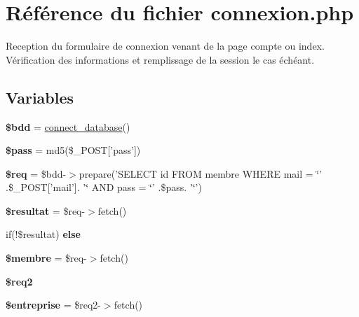 \hypertarget{connexion_8php}{\section{Référence du fichier connexion.\-php}
\label{connexion_8php}
}


Reception du formulaire de connexion venant de la page compte ou index. Vérification des informations et remplissage de la session le cas échéant.  


\subsection*{Variables}
\begin{DoxyCompactItemize}
\item 
\hypertarget{connexion_8php_a94f91e878bce0991e2cd595c5dd79b3f}{{\bfseries \$bdd} = \hyperlink{function_8php_a1f56f7efe8c1222675d8715c259957d5}{connect\-\_\-database}()}\label{connexion_8php_a94f91e878bce0991e2cd595c5dd79b3f}

\item 
\hypertarget{connexion_8php_a12ec2780b52bd1c54d38c2f981c0349f}{{\bfseries \$pass} = md5(\$\-\_\-\-P\-O\-S\-T\mbox{[}'pass'\mbox{]})}\label{connexion_8php_a12ec2780b52bd1c54d38c2f981c0349f}

\item 
\hypertarget{connexion_8php_a63a7a283ea5dee8af1e2d5a3435bf370}{{\bfseries \$req} = \$bdd-\/$>$prepare('S\-E\-L\-E\-C\-T id F\-R\-O\-M membre W\-H\-E\-R\-E mail = \char`\"{}' .\$\-\_\-\-P\-O\-S\-T\mbox{[}'mail'\mbox{]}. '\char`\"{} A\-N\-D pass = \char`\"{}' .\$pass. '\char`\"{}')}\label{connexion_8php_a63a7a283ea5dee8af1e2d5a3435bf370}

\item 
\hypertarget{connexion_8php_ab105533b60f7700245ebaa60e4d41336}{{\bfseries \$resultat} = \$req-\/$>$fetch()}\label{connexion_8php_ab105533b60f7700245ebaa60e4d41336}

\item 
if(!\$resultat) {\bfseries else}
\item 
\hypertarget{connexion_8php_aa000a46a528298c316b1fdf788402a63}{{\bfseries \$membre} = \$req-\/$>$fetch()}\label{connexion_8php_aa000a46a528298c316b1fdf788402a63}

\item 
{\bfseries \$req2}
\item 
\hypertarget{connexion_8php_a6d3423f147c69f4f47f014654a57fc93}{{\bfseries \$entreprise} = \$req2-\/$>$fetch()}\label{connexion_8php_a6d3423f147c69f4f47f014654a57fc93}


\end{DoxyCompactItemize}
